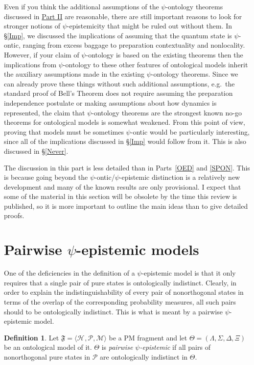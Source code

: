 \documentclass[DIV=calc,fontsize=12pt]{scrartcl} %
\theoremstyle{definition}
\newtheorem{definition}{Definition}[section]
\theoremstyle{plain}
\newcommand{\Hilb}[1][]{\ensuremath{\mathcal{H}_{#1}}}
\begin{document}
Even if you think the additional assumptions of the $\psi$-ontology
theorems discussed in \hyperref[SPON]{Part II} are reasonable, there are still
important reasons to look for stronger notions of $\psi$-epistemicity
that might be ruled out without them.  In \S\ref{Imp}, we discussed
the implications of assuming that the quantum state is $\psi$-ontic,
ranging from excess baggage to preparation contextuality and
nonlocality.  However, if your claim of $\psi$-ontology is based on
the existing theorems then the implications from $\psi$-ontology to
these other features of ontological models inherit the auxiliary
assumptions made in the existing $\psi$-ontology theorems.  Since we
can already prove these things without such additional assumptions,
e.g.\ the standard proof of Bell's Theorem does not require assuming
the preparation independence postulate or making assumptions about how
dynamics is represented, the claim that $\psi$-ontology theorems are
the strongest known no-go theorems for ontological models is somewhat
weakened.  From this point of view, proving that models must be
sometimes $\psi$-ontic would be particularly interesting, since all of
the implications discussed in \S\ref{Imp} would follow from it.  This
is also discussed in \S\ref{Never}.

The discussion in this part is less detailed than in Parts~\ref{OED}
and \ref{SPON}.  This is because going beyond the
$\psi$-ontic/$\psi$-epistemic distinction is a relatively new
development and many of the known results are only provisional.  I
expect that some of the material in this section will be obsolete by
the time this review is published, so it is more important to outline
the main ideas than to give detailed proofs.

\section{Pairwise $\psi$-epistemic models}

\label{Pair}

One of the deficiencies in the definition of a $\psi$-epistemic model
is that it only requires that a single pair of pure states is
ontologically indistinct.  Clearly, in order to explain the
indistinguishability of every pair of nonorthogonal states in terms of
the overlap of the corresponding probability measures, all such pairs
should to be ontologically indistinct.  This is what is meant by a
pairwise $\psi$-epistemic model.

\begin{definition}
Let $\mathfrak{F} = \langle \Hilb, \mathcal{P}, \mathcal{M} \rangle$
be a PM fragment and let $\Theta = (\Lambda, \Sigma, \Delta, \Xi)$ be
an ontological model of it.  $\Theta$ is \emph{pairwise
$\psi$-epistemic} if all pairs of nonorthogonal pure states in
$\mathcal{P}$ are ontologically indistinct in $\Theta$.
\end{definition}
\end{document}
